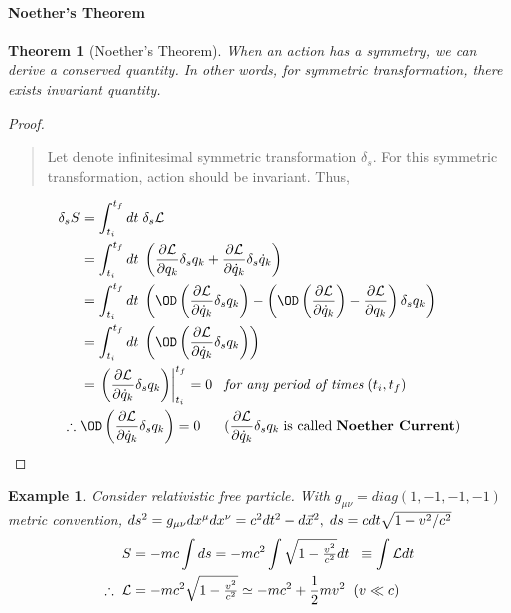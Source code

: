 \documentclass[final]{IEEEphot}
\newtheorem{theorem}{Theorem}[section]
\newtheorem{example}{Example}[section]
\newcommand{\PD}[2]{\dfrac{\partial #1}{\partial #2}} %
\newcommand{\At}[2]{\left.#1\right|_{#2}} %
\renewcommand{\L}{\mathcal{L}} %
\newcommand{\Lag}[1][q_k(t), \dot{q}_k(t),t]{\mathcal{L}( #1 )} %
\newcommand{\Act}[1][\Lag{}]{\int_{t_i}^{t_f}dt \hs #1} %
\newcommand{\BKS}[1]{\left( #1 \right)} %
\newcommand{\HS}{\hspace{0.3cm}} %
\newcommand{\VS}{\vspace{0.3cm}} %
\newcommand{\Com}{,\hspace{0.1cm}} %
\newcommand{\hs}{\hspace{0.1cm}} %
\begin{document}
\paragraph{Noether's Theorem}
\VS
\begin{theorem}[Noether's Theorem]
 When an action has a symmetry, we can derive a conserved quantity. In other words, for symmetric transformation, there exists invariant quantity.
\end{theorem}
\VS
\begin{proof}
\begin{quote}
 Let denote infinitesimal symmetric transformation $\delta_s$. For this symmetric transformation, action should be invariant. Thus,
\end{quote}
\VS
\begin{equation}
\begin{split}
  \delta_s S & = \Act[\delta_s \L]  \\
             & = \Act[\BKS{\PD{\L}{q_k}\delta_s q_k + \PD{\L}{\dot{q}_k} \delta_s \dot{q}_k }] \\
             & = \Act[\BKS{\OD\BKS{\PD{\L}{\dot{q}_k}\delta_s q_k} - \BKS{\OD\BKS{\PD{\L}{\dot{q}_k}} - \PD{\L}{q_k}} \delta_s q_k }]\\
             & = \Act[\BKS{\OD\BKS{\PD{\L}{\dot{q}_k}\delta_s q_k}}]\\
             & = \At{\BKS{\PD{\L}{\dot{q}_k}\delta_s q_k}  }{t_i}^{t_f} = 0 \HS \textit{for any period of times} \hs (t_i, t_f) \\
             \therefore \hs & \OD \BKS{\PD{\L}{\dot{q}_k}\delta_s q_k} = 0  \HS\HS (\PD{\L}{\dot{q}_k}\delta_s q_k \hs \textnormal{is called} \hs \textbf{Noether Current})
\end{split}
\end{equation}
\end{proof}
\VS

\begin{example}
 \normalfont
 Consider relativistic free particle. With $g_{\mu\nu}=diag(1,-1,-1,-1)$ metric convention, $ds^2=g_{\mu\nu}dx^\mu dx^\nu=c^2dt^2-d\vec{x}^2\Com ds=cdt\sqrt{1-v^2/c^2}$
 \begin{gather}
  \begin{split}
  S&=-mc\int ds=-mc^2\int\sqrt{1-\tfrac{v^2}{c^2}}dt \hs\hs \equiv\int\L dt \\
  \therefore \hs \L&=-mc^2\sqrt{1-\tfrac{v^2}{c^2}} \simeq -mc^2+\frac{1}{2}mv^2 \hs \hs (v\ll c)
  \end{split}
 \end{gather}
\end{example}
 
\end{document}
